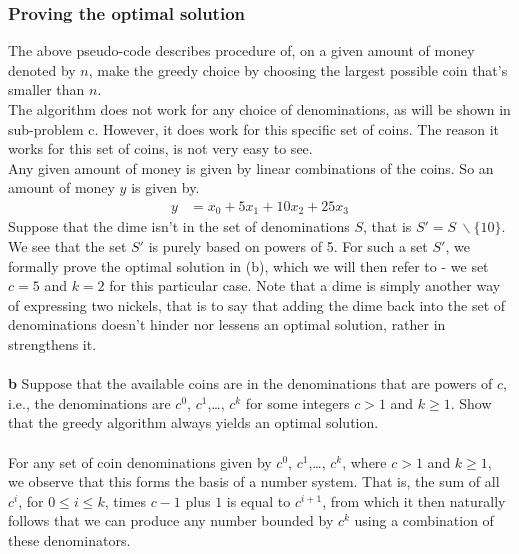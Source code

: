 \documentclass[11pt,english]{article}
\begin{document}
\subsubsection*{Proving the optimal solution}
\noindent The above pseudo-code describes procedure of, on a given amount 
of money denoted by $n$, make the greedy choice by choosing the largest 
possible coin that's smaller than $n$. \\
The algorithm does not work for any choice of denominations, as will be 
shown in sub-problem c. However, it does work for this specific set of 
coins. The reason it works for this set of coins, is not very easy to 
see. \\
Any given amount of money is given by linear combinations of the coins. 
So an amount of money $y$ is given by.
\begin{align*}
y &= x_0 + 5x_1 + 10x_2 +25x_3
\end{align*}
Suppose that the dime isn't in the set of denominations $S$, that is $S' =
S{\ }\backslash \{10\}$. We see that the set $S'$ is purely based on powers
of 5. For such a set $S'$, we formally prove the optimal solution in (b),
which we will then refer to - we set $c=5$ and $k=2$ for this particular case.
Note that a dime is simply another way of expressing two nickels, that is to
say that adding the dime back into the set of denominations doesn't hinder
nor lessens an optimal solution, rather in strengthens it.
\\\\
\noindent \large{\textbf{b} Suppose that the available coins are in the
denominations that are powers of $c$, i.e., the denominations are $c^0$,
$c^1$,\dots, $c^k$ for some integers $c > 1$ and $k \geq 1$. Show that
the greedy algorithm always yields an optimal solution.}
\\\\
For any set of coin denominations given by $c^0$, $c^1$,\dots, $c^k$, where
$c > 1$ and $k \geq 1$, we observe that this forms the basis of a number
system. That is, the sum of all $c^i$, for $0 \leq i \leq k$, times $c - 1$
plus $1$ is equal to $c^{i+1}$, from which it then naturally follows that we
can produce any number bounded by $c^k$ using a combination of these denominators.
\end{document}
